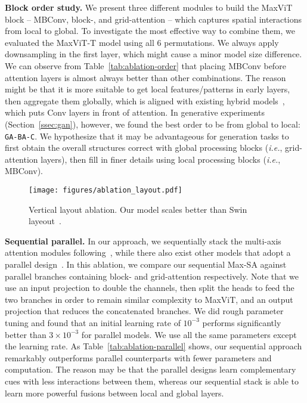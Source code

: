 \documentclass[runningheads]{llncs}
\def\ie{\emph{i.e.}, }
\begin{document}
\noindent\textbf{Block order study.} We present three different modules to build the MaxViT block -- MBConv, block-, and grid-attention -- which captures spatial interactions from local to global. To investigate the most effective way to combine them, we evaluated the MaxViT-T model using all 6 permutations. We always apply downsampling in the first layer, which might cause a minor model size difference. We can observe from Table~\ref{tab:ablation-order} that placing MBConv before attention layers is almost always better than other combinations.
The reason might be that it is more suitable to get local features/patterns in early layers, then aggregate them globally, which is aligned with existing hybrid models~\cite{dai2021coatnet,xiao2021early}, which puts Conv layers in front of attention.
In generative experiments (Section~\ref{ssec:gan}), however, we found the best order to be from global to local: \texttt{GA-BA-C}. We hypothesize that it may be advantageous for generation tasks to first obtain the overall structures correct with global processing blocks (\ie grid-attention layers), then fill in finer details using local processing blocks (\ie MBConv).

\begin{wrapfigure}{R}{0.4\textwidth}
\vspace{-11mm}
\begin{center}
\texttt{[image: figures/ablation\_layout.pdf]}
\end{center}
\vspace{-6mm}
\caption{Vertical layout ablation. Our model scales better than Swin layeout~\cite{liu2021swin}.}
\label{fig:ablation-layout}
\vspace{-12mm}
\end{wrapfigure}

\noindent\textbf{Sequential \vs parallel.} In our approach, we sequentially stack the multi-axis attention modules following~\cite{liu2021swin,wang2020axial}, while there also exist other models that adopt a parallel design~\cite{zhao2021improved,tu2022maxim}. In this ablation, we compare our sequential Max-SA against parallel branches containing block- and grid-attention respectively. Note that we use an input projection to double the channels, then split the heads to feed the two branches in order to remain similar complexity to MaxViT, and an output projection that reduces the concatenated branches. We did rough parameter tuning and found that an initial learning rate of $10^{-3}$ performs significantly better than $3\times10^{-3}$ for parallel models. We use all the same parameters except the learning rate. As Table~\ref{tab:ablation-parallel} shows, our sequential approach remarkably outperforms parallel counterparts with fewer parameters and computation. The reason may be that the parallel designs learn complementary cues with less interactions between them, whereas our sequential stack is able to learn more powerful fusions between local and global layers. 
\end{document}
